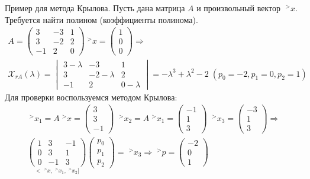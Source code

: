 \documentclass[__main__.tex]{subfiles}
\begin{document}
Пример для метода Крылова.
Пусть дана матрица $A$ и произвольный вектор $\;^{>}x$. Требуется найти полином (коэффициенты полинома).
\begin{gather*}
	A=
	\begin{pmatrix}
		3 & -3 & 1 \\
		3 & -2 & 2 \\
		-1 & 2 & 0
	\end{pmatrix}
	\;^{>}x=
	\begin{pmatrix}
		1 \\ 0 \\ 0
	\end{pmatrix}\Rightarrow\\
	\mathcal{X}_{rA}(\lambda)=
	\begin{vmatrix}
			3-\lambda & -3 & 1 \\
		3 & -2-\lambda & 2 \\
		-1 & 2 & 0-\lambda
	\end{vmatrix}=
	-\lambda^3+\lambda^2-2 \;(p_0=-2, p_1=0, p_2=1)
\end{gather*}
Для проверки воспользуемся методом Крылова:
\begin{gather*}
	\;^{>}x_1=A\;^{>}x=
	\begin{pmatrix}
		3 \\ 3 \\ -1
	\end{pmatrix}
\;	\;^{>}x_2=A\;^{>}x_1=
	\begin{pmatrix}
		-1 \\ 1 \\ 3
	\end{pmatrix}
\;	\;^{>}x_3=
	\begin{pmatrix}
		-3 \\ 1 \\ 3
	\end{pmatrix}\Rightarrow\\
\underset{<\;^{>}x,\;^{>}x_1,\;^{>}x_2]}{\begin{pmatrix}
		1 & 3 & -1 \\
		0 & 3 & 1 \\
		0 & -1 & 3
	\end{pmatrix}}
	\begin{pmatrix}
		p_0 \\ p_1 \\ p_2
	\end{pmatrix}=\;^{>}x_3\Rightarrow
	\;^{>}p=
	\begin{pmatrix}
		-2 \\ 0 \\ 1
	\end{pmatrix}
\end{gather*}
\end{document}
